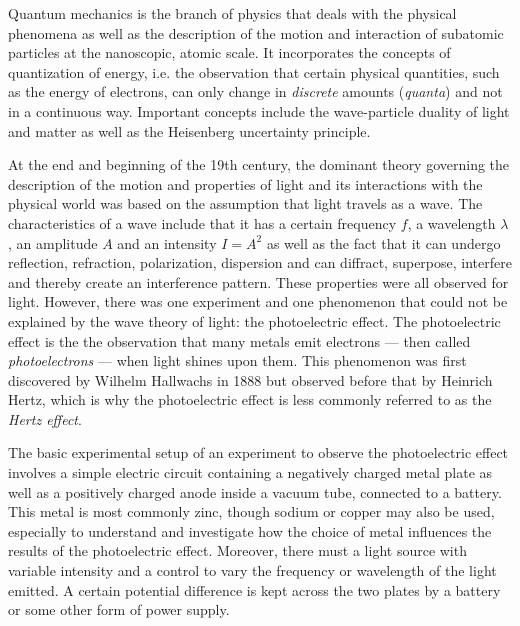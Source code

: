 
Quantum mechanics is the branch of physics that deals with the physical phenomena as well as the description of the motion and interaction of subatomic particles at the nanoscopic, atomic scale. It incorporates the concepts of quantization of energy, i.e. the observation that certain physical quantities, such as the energy of electrons, can only change in \emph{discrete} amounts (\emph{quanta}) and not in a continuous way. Important concepts include the wave-particle duality of light and matter as well as the Heisenberg uncertainty principle.


At the end and beginning of the 19th century, the dominant theory governing the description of the motion and properties of light and its interactions with the physical world was based on the assumption that light travels as a wave. The characteristics of a wave include that it has a certain frequency $f$, a wavelength $\lambda$, an amplitude $A$ and an intensity $I = A^2$ as well as the fact that it can undergo reflection, refraction, polarization, dispersion and can diffract, superpose, interfere and thereby create an interference pattern. These properties were all observed for light. However, there was one experiment and one phenomenon that could not be explained by the wave theory of light: the photoelectric effect. The photoelectric effect is the the observation that many metals emit electrons --- then called \emph{photoelectrons} --- when light shines upon them. This phenomenon was first discovered by Wilhelm Hallwachs in 1888 but observed before that by Heinrich Hertz, which is why the photoelectric effect is less commonly referred to as the \emph{Hertz effect}.


The basic experimental setup of an experiment to observe the photoelectric effect involves a simple electric circuit containing a negatively charged metal plate as well as a positively charged anode inside a vacuum tube, connected to a battery. This metal is most commonly zinc, though sodium or copper may also be used, especially to understand and investigate how the choice of metal influences the results of the photoelectric effect. Moreover, there must a light source with variable intensity and a control to vary the frequency or wavelength of the light emitted. A certain potential difference is kept across the two plates by a battery or some other form of power supply.

